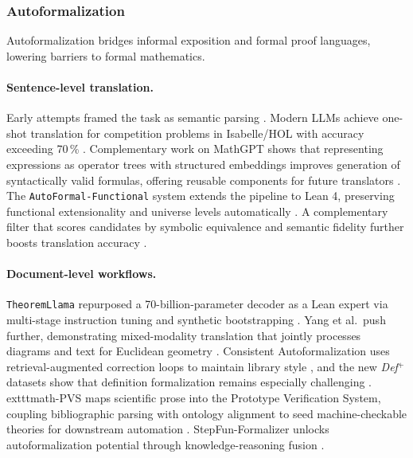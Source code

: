 \documentclass[acmsmall,anonymous]{acmart}
\begin{document}
\subsubsection{Autoformalization}\label{sec:autoformal}
Autoformalization bridges informal exposition and formal proof languages, lowering barriers to formal mathematics.

\paragraph{Sentence-level translation.}
Early attempts framed the task as semantic parsing \cite{wang2018first}.  Modern LLMs achieve one-shot translation for competition problems in Isabelle/HOL with accuracy exceeding 70\,\% \cite{wu2022autoformalization}.  Complementary work on MathGPT shows that representing expressions as operator trees with structured embeddings improves generation of syntactically valid formulas, offering reusable components for future translators \cite{scarlatos-2023-tree-mathgpt}.  The \texttt{AutoFormal-Functional} system extends the pipeline to Lean 4, preserving functional extensionality and universe levels automatically \cite{buali2024towards}. A complementary filter that scores candidates by symbolic equivalence and semantic fidelity further boosts translation accuracy \cite{li2024symbolicautoformal}.

\paragraph{Document-level workflows.}
\texttt{TheoremLlama} repurposed a 70-billion-parameter decoder as a Lean expert via multi-stage instruction tuning and synthetic bootstrapping \cite{gu2024theoremllama}.  Yang et al.\ push further, demonstrating mixed-modality translation that jointly processes diagrams and text for Euclidean geometry \cite{wu2022autoformalization,murphy2024autoformalizing}. Consistent Autoformalization uses retrieval-augmented correction loops to maintain library style \cite{zhang2024consistentautoformal}, and the new \textit{Def$^{+}$} datasets show that definition formalization remains especially challenging \cite{zhang2025definitions}. 	exttt{math-PVS} maps scientific prose into the Prototype Verification System, coupling bibliographic parsing with ontology alignment to seed machine-checkable theories for downstream automation \cite{saidi-2023-mathpvs}. StepFun-Formalizer unlocks autoformalization potential through knowledge-reasoning fusion \cite{wu2025stepfunformalizer}.
\end{document}
